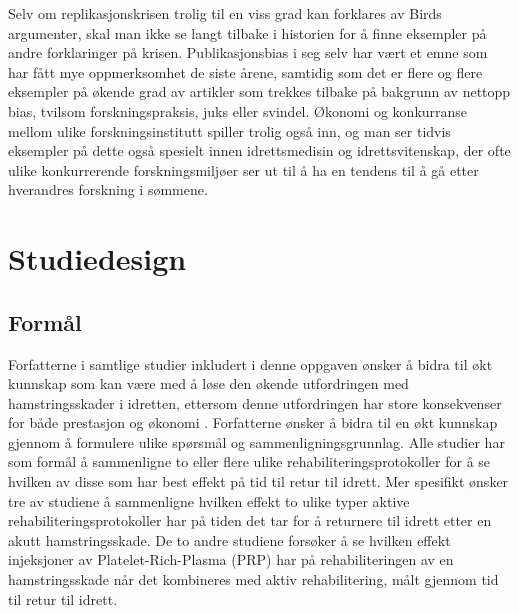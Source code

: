 \documentclass[
]{book}
\begin{document}
Selv om replikasjonskrisen trolig til en viss grad kan forklares av Birds argumenter, skal man ikke se langt tilbake i historien for å finne eksempler på andre forklaringer på krisen\citep{fanelli2009, joober2012}. Publikasjonsbias i seg selv har vært et emne som har fått mye oppmerksomhet de siste årene, samtidig som det er flere og flere eksempler på økende grad av artikler som trekkes tilbake på bakgrunn av nettopp bias, tvilsom forskningspraksis, juks eller svindel\citep{amos2014}. Økonomi og konkurranse mellom ulike forskningsinstitutt spiller trolig også inn, og man ser tidvis eksempler på dette også spesielt innen idrettsmedisin og idrettsvitenskap, der ofte ulike konkurrerende forskningsmiljøer ser ut til å ha en tendens til å gå etter hverandres forskning i sømmene\citep{dalen-lorentsen2020, hulin2016, impellizzeri2021, van_der_horst2015}.

\hypertarget{studiedesign}{%
\chapter{Studiedesign}\label{studiedesign}}

\hypertarget{formuxe5l-1}{%
\section{Formål}\label{formuxe5l-1}}

Forfatterne i samtlige studier inkludert i denne oppgaven ønsker å bidra til økt kunnskap som kan være med å løse den økende utfordringen med hamstringsskader i idretten, ettersom denne utfordringen har store konsekvenser for både prestasjon og økonomi \citep{ekstrand2011, hickey2014, eirale2013, hickey2020, askling2014, hamilton2015, ahamid2014, askling2013}. Forfatterne ønsker å bidra til en økt kunnskap gjennom å formulere ulike spørsmål og sammenligningsgrunnlag. Alle studier har som formål å sammenligne to eller flere ulike rehabiliteringsprotokoller for å se hvilken av disse som har best effekt på tid til retur til idrett. Mer spesifikt ønsker tre av studiene å sammenligne hvilken effekt to ulike typer aktive rehabiliteringsprotokoller har på tiden det tar for å returnere til idrett etter en akutt hamstringsskade\citep[\citet{askling2013}, \citet{hickey2020}]{askling2014}. De to andre studiene forsøker å se hvilken effekt injeksjoner av Platelet-Rich-Plasma (PRP) har på rehabiliteringen av en hamstringsskade når det kombineres med aktiv rehabilitering, målt gjennom tid til retur til idrett\citep{ahamid2014, hamilton2015}.
\end{document}
